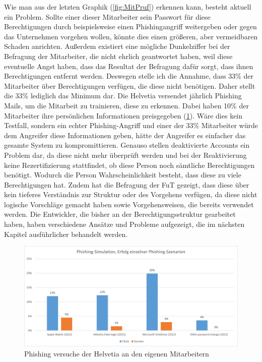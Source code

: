 Wie man aus der letzten Graphik (\ref{fig:MitPruf}) erkennen kann, besteht aktuell ein Problem.
Sollte einer dieser Mitarbeiter sein Passwort für diese Berechtigungen durch beispielsweise einen Phishingangriff weitergeben oder gegen das Unternehmen vorgehen wollen, könnte dies einen größeren, aber vermeidbaren Schaden anrichten.
Außerdem existiert eine mögliche Dunkelziffer bei der Befragung der Mitarbeiter, die nicht ehrlich geantwortet haben, weil diese eventuelle Angst haben, dass das Resultat der Befragung dafür sorgt, dass ihnen Berechtigungen entfernt werden.
Deswegen stelle ich die Annahme, dass 33\% der Mitarbeiter über Berechtigungen verfügen, die diese nicht benötigen.
Daher stellt die 33\% lediglich das Minimum dar.
Die Helvetia versendet jährlich Phishing Mails, um die Mitarbeit zu trainieren, diese zu erkennen.
Dabei haben 10\% der Mitarbeiter ihre persönlichen Informationen preisgegeben (\ref{fig:Bef}).
Wäre dies kein Testfall, sondern ein echter Phishing-Angriff und einer der 33\% Mitarbeiter würde dem Angreifer diese Informationen geben, hätte der Angreifer es einfacher das gesamte System zu kompromittieren.
\newline
\newline
Genauso stellen deaktivierte Accounts ein Problem dar, da diese nicht mehr überprüft werden und bei der Reaktivierung keine Rezertifizierung stattfindet, ob diese Person noch sämtliche Berechtigungen benötigt.
Wodurch die Person Wahrscheinlichkeit besteht, dass diese zu viele Berechtigungen hat.
Zudem hat die Befragung der \ac{FuT} gezeigt, dass diese über kein tieferes Verständnis zur Struktur oder des Vorgehens verfügen, da diese nicht logische Vorschläge gemacht haben sowie Vorgehensweisen, die bereits verwendet werden.
Die Entwickler, die bisher an der Berechtigungsstruktur gearbeitet haben, haben verschiedene Ansätze und Probleme aufgezeigt, die im nächsten Kapitel ausführlicher behandelt werden.
\begin{figure}[h!]
 \centering
 \includegraphics[width=1\textwidth]{gfx/Picture/Befragung.PNG}
 \caption{Phishing versuche der Helvetia an den eigenen Mitarbeitern \cite{Helvetia}}
 \label{fig:Bef}
\end{figure}

